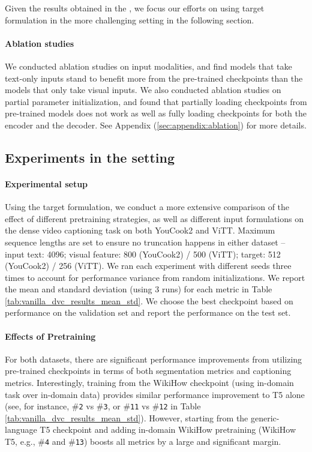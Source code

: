 \documentclass[11pt]{article}
\begin{document}
Given the results obtained in the \partitionsetting, we focus our efforts on using \offsetbased target formulation in the more challenging \vanilla setting in the following section.


\paragraph{Ablation studies} We conducted ablation studies on input modalities, and find models that take text-only inputs stand to benefit more from the pre-trained checkpoints than the models that only take visual inputs.
We also conducted ablation studies on partial parameter initialization, and found that partially loading checkpoints from pre-trained models does not work as well as fully loading checkpoints for both the encoder and the decoder. See Appendix (\ref{sec:appendix:ablation}) for more details.



\subsection{Experiments in the \vanilla setting}
\paragraph{Experimental setup}
Using the \offsetbased target formulation, we conduct a more extensive comparison of the effect of different pretraining strategies, as well as different input formulations on the \vanilla dense video captioning task on both YouCook2 and ViTT.
Maximum sequence lengths are set to ensure no truncation happens in either dataset -- input text: 4096; visual feature: 800 (YouCook2) / 500 (ViTT); target: 512 (YouCook2) / 256 (ViTT).
We ran each experiment with different seeds three times to account for performance variance from random initializations.  
We report the mean and standard deviation (using 3 runs) for each metric in Table \ref{tab:vanilla_dvc_results_mean_std}.
We choose the best checkpoint based on performance on the validation set and report the performance on the test set.


\paragraph{Effects of Pretraining} For both datasets, there are significant performance improvements from utilizing pre-trained checkpoints in terms of both segmentation metrics and captioning metrics.
Interestingly, training from the WikiHow checkpoint (using in-domain task over in-domain data) provides similar performance improvement to T5 alone (see, for instance, \#\texttt{2} vs \#\texttt{3}, or \#\texttt{11} vs \#\texttt{12} in Table \ref{tab:vanilla_dvc_results_mean_std}).
However, starting from the generic-language T5 checkpoint and adding in-domain WikiHow pretraining (WikiHow T5, e.g., \#\texttt{4} and \#\texttt{13}) boosts all metrics by a large and significant margin.
\end{document}

